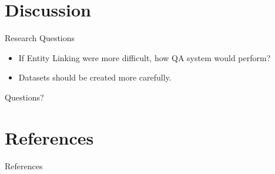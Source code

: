 \documentclass[]{beamer}
\newcommand{\mSlideTitle}{{{\secname}}}
\begin{document}
\section{Discussion}
  \begin{frame}{\mSlideTitle}
    \begin{alertblock}{Research Questions}
      \begin{itemize}
        \item If Entity Linking were more difficult, how QA system would perform?
        \item Datasets should be created more carefully.
      \end{itemize}
    \end{alertblock}
  \end{frame}

  \begin{frame}[standout]
    Questions?
  \end{frame}

\section{References}
\begin{frame}[allowframebreaks]{References}
  \printbibliography%
\end{frame}
\end{document}
